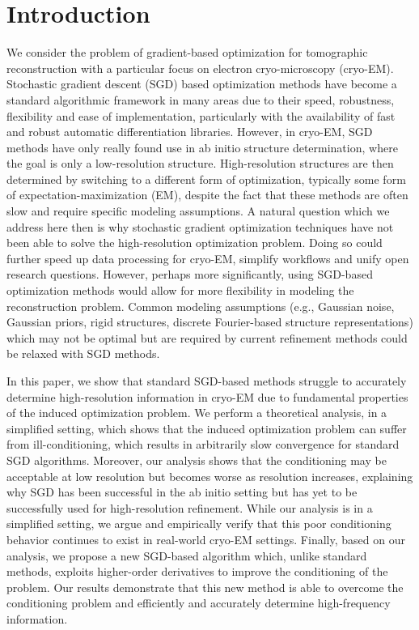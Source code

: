 \documentclass{article}
\begin{document}
\section{Introduction}
We consider the problem of gradient-based optimization for tomographic reconstruction with a particular focus on electron cryo-microscopy (cryo-EM).
Stochastic gradient descent (SGD) based optimization methods have become a standard algorithmic framework in many areas due to their speed, robustness, flexibility and ease of implementation, particularly with the availability of fast and robust automatic differentiation libraries.
However, in cryo-EM, SGD methods have only really found use in ab initio structure determination, where the goal is only a low-resolution structure.
High-resolution structures are then determined by switching to a different form of optimization, typically some form of expectation-maximization (EM), despite the fact that these methods are often slow and require specific modeling assumptions.
A natural question which we address here then is why stochastic gradient optimization techniques have not been able to solve the high-resolution optimization problem.
Doing so could further speed up data processing for cryo-EM, simplify workflows and unify open research questions.
However, perhaps more significantly, using SGD-based optimization methods would allow for more flexibility in modeling the reconstruction problem.
Common modeling assumptions (e.g., Gaussian noise, Gaussian priors, rigid structures,  discrete Fourier-based structure representations) which may not be optimal but are required by current refinement methods could be relaxed with SGD methods.

In this paper, we show that standard SGD-based methods struggle to accurately determine high-resolution information in cryo-EM due to fundamental properties of the induced optimization problem.
We perform a theoretical analysis, in a simplified setting, which shows that the induced optimization problem can suffer from ill-conditioning, which results in arbitrarily slow convergence for standard SGD algorithms.
Moreover, our analysis shows that the conditioning may be acceptable at low resolution but becomes worse as resolution increases, explaining why SGD has been successful in the ab initio setting but has yet to be successfully used for high-resolution refinement.
While our analysis is in a simplified setting, we argue and empirically verify that this poor conditioning behavior continues to exist in real-world cryo-EM settings.
Finally, based on our analysis, we propose a new SGD-based algorithm which, unlike standard methods, exploits higher-order derivatives to improve the conditioning of the problem.
Our results demonstrate that this new method is able to overcome the conditioning problem and efficiently and accurately determine high-frequency information.
\end{document}
